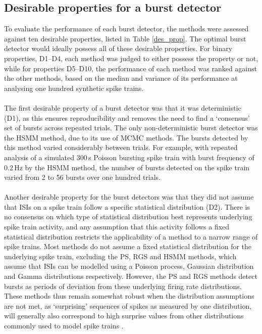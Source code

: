 \documentclass[12pt, titlepage]{article}
\begin{document}
	\subsection*{Desirable properties for a burst detector}
	To evaluate the performance of each burst detector, the methods were assessed against ten desirable properties, listed in Table \ref{des_prop}. The optimal burst detector would ideally possess all of these desirable properties. For binary properties, D1--D4, each method was judged to either possess the property or not, while for properties D5--D10, the performance of each method was ranked against the other methods, based on the median and variance of its performance at analysing one hundred synthetic spike trains. 
	\\ \\ The first desirable property of a burst detector was that it was deterministic (D1), as this ensures reproducibility and removes the need to find a `consensus' set of bursts across repeated trials. The only non-deterministic burst detector was the HSMM method, due to its use of MCMC methods. The bursts detected by this method varied considerably between trials. For example, with repeated analysis of a simulated $300\,$s Poisson bursting spike train with burst frequency of 0.2$\,$Hz by the HSMM method, the number of bursts detected on the spike train varied from 2 to 56 bursts over one hundred trials. 
	\\ \\ Another desirable property for the burst detectors was that they did not assume that ISIs on a spike train follow a specific statistical distribution (D2). There is no consensus on which type of statistical distribution best represents underlying spike train activity, and any assumption that this activity follows a fixed statistical distribution restricts the applicability of a method to a narrow range of spike trains. Most methods do not assume a fixed statistical distribution for the underlying spike train, excluding the PS, RGS and HSMM methods, which assume that ISIs can be modelled using a Poisson process, Gaussian distribution and Gamma distributions respectively. However, the PS and RGS methods detect bursts as periods of deviation from these underlying firing rate distributions.
	These methods thus remain somewhat robust when the distribution assumptions are not met, as `surprising' sequences of spikes as measured by one distribution, will generally also correspond to high surprise values from other distributions commonly used to model spike trains \cite{Legendy1985}. 
\end{document}
